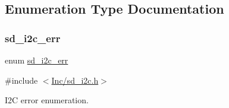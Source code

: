 \subsection{Enumeration Type Documentation}
\mbox{\label{group___s_d___i2_c___types_gae1e3131e61bdef08371262ffb4948a04}} 
\subsubsection{\texorpdfstring{sd\+\_\+i2c\+\_\+err}{sd\_i2c\_err}}
{\footnotesize\ttfamily enum \mbox{\hyperlink{group___s_d___i2_c___types_gae1e3131e61bdef08371262ffb4948a04}{sd\+\_\+i2c\+\_\+err}}}



{\ttfamily \#include $<$\mbox{\hyperlink{sd__i2c_8h}{Inc/sd\+\_\+i2c.\+h}}$>$}



I2C error enumeration. 


